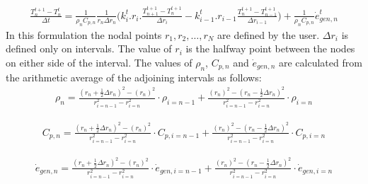\documentclass[11pt,letterpaper,titlepage]{article}
\newcommand{\half}{\frac{1}{2}}
\begin{document}
\begin{equation}
\begin{aligned}
\frac{T_n^{t+1}-T_n^t}{\Delta t} = \frac{1}{\rho_n C_{p,n}} \frac{1}{r_n\Delta r_n} \biggr(  k_i^t.r_i. \frac{T_{n+1}^{t+1} - T_{n}^{t+1}}{\Delta r_i}  - k_{i-1}^t.r_{i-1} \frac{T_{n}^{t+1} - T_{n-1}^{t+1}}{\Delta r_{i-1}} \biggr) + \frac{1}{\rho_n C_{p,n}} \dot{e}_{gen,n}^t
\end{aligned}
\end{equation}
\newline
In this formulation the nodal points $r_1,r_2,\dots,r_N$ are defined by the user. $\Delta r_i$ is defined only on intervals. The value of $r_i$ is the halfway point between the nodes on either side of the interval. The values of $\rho_n$, $C_{p,n}$ and $\dot{e}_{gen,n}$ are calculated from the arithmetic average of the adjoining intervals as follows:
\newpage
\begin{equation*}
\begin{aligned}
\rho_n=\frac{(r_n+\half \Delta r_n)^2  -  (r_n)^2}{r_{i=n-1}^2-r_{i=n}^2} \cdot \rho_{i=n-1}
      +\frac{(r_n)^2  -  (r_n-\half \Delta r_n)^2}{r_{i=n-1}^2-r_{i=n}^2} \cdot \rho_{i=n}
\end{aligned}
\end{equation*}

\begin{equation*}
\begin{aligned}
C_{p,n}=\frac{(r_n+\half \Delta r_n)^2  -  (r_n)^2}{r_{i=n-1}^2-r_{i=n}^2} \cdot C_{p,i=n-1}
      +\frac{(r_n)^2  -  (r_n-\half \Delta r_n)^2}{r_{i=n-1}^2-r_{i=n}^2} \cdot C_{p,i=n}
\end{aligned}
\end{equation*}

\begin{equation*}
\begin{aligned}
\dot{e}_{gen,n}=\frac{(r_n+\half \Delta r_n)^2  -  (r_n)^2}{r_{i=n-1}^2-r_{i=n}^2} \cdot \dot{e}_{gen,i=n-1}
               +\frac{(r_n)^2  -  (r_n-\half \Delta r_n)^2}{r_{i=n-1}^2-r_{i=n}^2} \cdot \dot{e}_{gen,i=n}
\end{aligned}
\end{equation*}






\newpage
\end{document}
